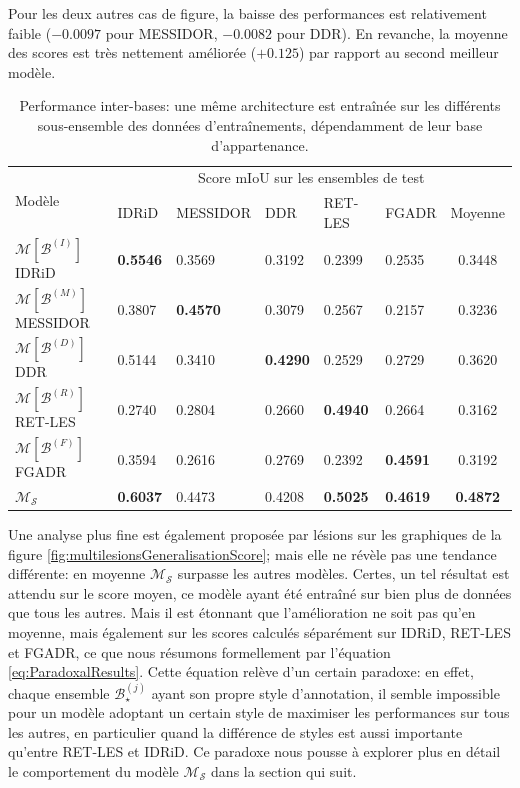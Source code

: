 Pour les deux autres cas de figure, la baisse des performances est relativement faible ($-0.0097$ pour MESSIDOR, $-0.0082$ pour \ac{DDR}). En revanche, la moyenne des scores est très nettement améliorée ($+0.125$) par rapport au second meilleur modèle.
\begin{table}
	\caption{Performance inter-bases: une même architecture est entraînée sur les différents sous-ensemble des données d'entraînements, dépendamment de leur base d'appartenance.}
	\label{tab:generalisationPerfSegmentation}
	\begin{tabularx}{\textwidth}{Xlllllc}
		\toprule
		\multirow{2}{3em}{Modèle} & \multicolumn{6}{c}{Score \ac{mIoU} sur les ensembles de test}\\
		\cmidrule{2-7}
		 & \ac{IDRiD}& MESSIDOR& \ac{DDR}& RET-LES& \ac{FGADR} & Moyenne\\
		\midrule
		$\mathcal{M}[\mathcal{B}^{(I)}]$ \ac{IDRiD} & \textbf{0.5546} & 0.3569 & 0.3192 & 0.2399 & 0.2535 & 0.3448 \\
		$\mathcal{M}[\mathcal{B}^{(M)}]$ MESSIDOR & 0.3807 & \textbf{0.4570} & 0.3079 & 0.2567 & 0.2157 & 0.3236 \\
		$\mathcal{M}[\mathcal{B}^{(D)}]$ \ac{DDR} & 0.5144 & 0.3410 & \textbf{0.4290} & 0.2529 & 0.2729 & 0.3620 \\
		$\mathcal{M}[\mathcal{B}^{(R)}]$ RET-LES & 0.2740 & 0.2804 & 0.2660 & \textbf{0.4940} & 0.2664 & 0.3162 \\
		$\mathcal{M}[\mathcal{B}^{(F)}]$ \ac{FGADR} & 0.3594 & 0.2616 & 0.2769 & 0.2392 & \textbf{0.4591} & 0.3192 \\
		\midrule
		$\mathcal{M}_\mathcal{S}$ & \textbf{0.6037} & 0.4473 & 0.4208 & \textbf{0.5025} & \textbf{0.4619} & \textbf{0.4872} \\
		\bottomrule
	\end{tabularx}
\end{table}
Une analyse plus fine est également proposée par lésions sur les graphiques de la figure \ref{fig:multilesionsGeneralisationScore}; mais elle ne révèle pas une tendance différente: en moyenne $\mathcal{M}_\mathcal{S}$ surpasse les autres modèles. Certes, un tel résultat est attendu sur le score moyen, ce modèle ayant été entraîné sur bien plus de données que tous les autres. Mais il est étonnant que l'amélioration ne soit pas qu'en moyenne, mais également sur les scores calculés séparément sur IDRiD, RET-LES et FGADR, ce que nous résumons formellement par l'équation \ref{eq:ParadoxalResults}. Cette équation relève d'un certain paradoxe: en effet, chaque ensemble $\mathcal{B}^{(j)}_{\star}$ ayant son propre style d'annotation, il semble impossible pour un modèle adoptant un certain style de maximiser les performances sur tous les autres, en particulier quand la différence de styles est aussi importante qu'entre RET-LES et IDRiD. Ce paradoxe nous pousse à explorer plus en détail le comportement du modèle $\mathcal{M}_\mathcal{S}$ dans la section qui suit.

